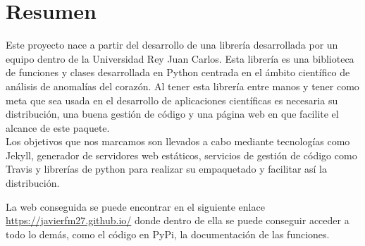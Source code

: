 \chapter*{Resumen}

Este proyecto nace a partir del desarrollo de una librería desarrollada por un equipo dentro de la Universidad Rey Juan Carlos. Esta librería es una biblioteca de funciones y clases desarrollada en Python centrada en el ámbito científico de análisis de anomalías del corazón. Al tener esta librería entre manos y tener como meta que sea usada en el desarrollo de aplicaciones científicas es necesaria su distribución, una buena gestión de código y una página web en que facilite el alcance de este paquete. \\

Los objetivos que nos marcamos son llevados a cabo mediante tecnologías como Jekyll, generador de servidores web estáticos, servicios de gestión de código como Travis y librerías de python para realizar su empaquetado y facilitar así la distribución.

La web conseguida se puede encontrar en el siguiente enlace \url{https://javierfm27.github.io/} donde dentro de ella se puede conseguir acceder a todo lo demás, como el código en PyPi, la documentación de las funciones.
